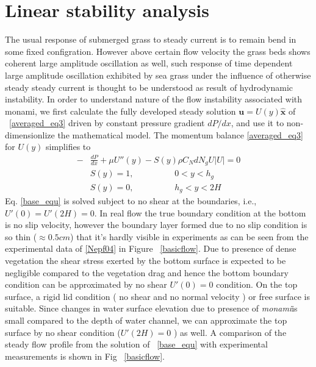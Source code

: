 \documentclass[12pt]{report}   %
\newcommand{\bu}{\mathbf{u}}
\newcommand{\hg}{h_g}
\newcommand{\monami}{\textit{monami}}
\begin{document}
\chapter{Linear stability analysis}
The usual response of submerged grass to steady current is to remain bend in some fixed configration. However above certain flow velocity the grass beds shows coherent large amplitude oscillation as well, such response of time dependent large amplitude oscillation exhibited by sea grass under the influence of otherwise steady steady current is thought to be understood as result of hydrodynamic instability. In order to understand nature of the flow instability associated with monami, we first calculate the fully developed steady solution $\bu = U(y)\boldsymbol{\hat{x}}$ of ~\eqref{averaged_eq3} driven by constant pressure gradient $dP/dx$, and use it to non-dimensionlize the mathematical model. The momentum balance \eqref{averaged_eq3} for $U(y)$ simplifies to
\begin{equation}
\begin{split}
 -&\frac{dP}{dx}+\mu U''(y) -S(y) \rho C_N d N_gU |U| =0\\
 &S(y) = 1, \hspace{2cm} 0<y<\hg\\
 &S(y) = 0, \hspace{2cm} \hg< y< 2H
\label{base_equ}
\end{split}
\end{equation}
Eq. \eqref{base_equ} is solved subject to no shear at the boundaries, i.e., $U'(0) = U'(2H) = 0$. In real flow the true boundary condition at the bottom is no slip velocity, however the boundary layer formed due to no slip condition is so thin ($\approx 0.5 cm$) that it's hardly visible in experiments as can be seen from the experimental data of \ref{Nepf04} in Figure ~\ref{basicflow}. Due to presence of dense vegetation the shear stress exerted by the bottom surface is expected to be negligible compared to the vegetation drag \cite{Nepf04 } and hence the bottom boundary condition can be approximated by no shear $U'(0)=0$ condition.
On the top surface, a rigid lid condition ( no shear and no normal velocity ) or free surface is suitable. Since changes in water surface elevation due to presence of \monami  is small compared to the depth of water channel, we can approximate the top surface by no shear condition ($ U'(2H)=0$ ) as well.
A comparison of the steady flow profile from the solution of ~\eqref{base_equ} with experimental measurements is shown in Fig ~\ref{basicflow}.
\end{document}
